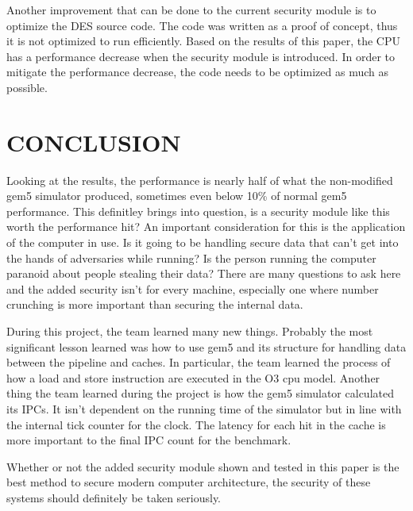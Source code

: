 \documentclass[letterpaper, 10pt, conference]{ieeeconf}  %
\begin{document}
Another improvement that can be done to the current security module is to optimize the DES source code.  The code was written as a proof of concept, thus it is not optimized to run efficiently.  Based on the results of this paper, the CPU has a performance decrease when the security module is introduced.  In order to mitigate the performance decrease, the code needs to be optimized as much as possible.

\section{CONCLUSION}

Looking at the results, the performance is nearly half of what the non-modified gem5 simulator produced, sometimes even below 10\% of normal gem5 performance. This definitley brings into question, is a security module like this worth the performance hit? An important consideration for this is the application of the computer in use. Is it going to be handling secure data that can't get into the hands of adversaries while running? Is the person running the computer paranoid about people
stealing their data? There are many questions to ask here and the added security isn't for every machine, especially one where number crunching is more important than securing the internal data.

During this project, the team learned many new things. Probably the most significant lesson learned was how to use gem5 and its structure for handling data between the pipeline and caches. In particular, the team learned the process of how a load and store instruction are executed in the O3 cpu model. Another thing the team learned during the project is how the gem5 simulator calculated its IPCs. It isn't dependent on the running time of the simulator but in line with the internal tick counter for
the clock. The latency for each hit in the cache is more important to the final IPC count for the benchmark.

Whether or not the added security module shown and tested in this paper is the best method to secure modern computer architecture, the security of these systems should definitely be taken seriously.

\addtolength{\textheight}{-12cm}   %
\end{document}
